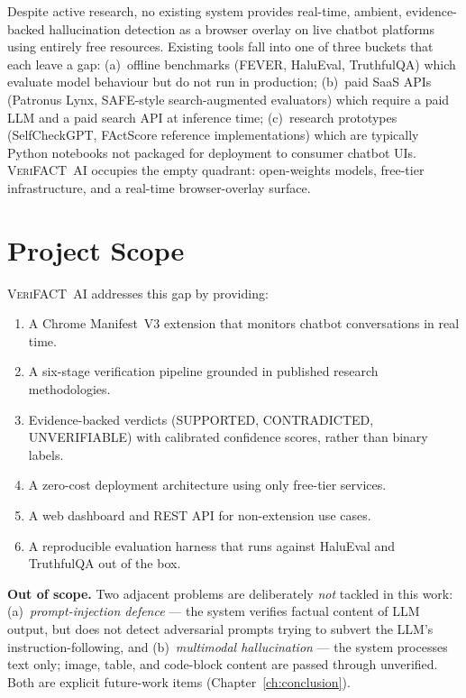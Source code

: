 \documentclass[12pt, a4paper, oneside]{report}
\newcommand{\verifact}{\textsc{VeriFACT~AI}}
\begin{document}
Despite active research, no existing system provides real-time, ambient, evidence-backed hallucination detection as a browser overlay on live chatbot platforms using entirely free resources. Existing tools fall into one of three buckets that each leave a gap: (a)~offline benchmarks (FEVER, HaluEval, TruthfulQA) which evaluate model behaviour but do not run in production; (b)~paid SaaS APIs (Patronus Lynx, SAFE-style search-augmented evaluators) which require a paid LLM and a paid search API at inference time; (c)~research prototypes (SelfCheckGPT, FActScore reference implementations) which are typically Python notebooks not packaged for deployment to consumer chatbot UIs. \verifact{} occupies the empty quadrant: open-weights models, free-tier infrastructure, and a real-time browser-overlay surface.

\section{Project Scope}

\verifact{} addresses this gap by providing:
\begin{enumerate}[nosep]
    \item A Chrome Manifest~V3 extension that monitors chatbot conversations in real time.
    \item A six-stage verification pipeline grounded in published research methodologies.
    \item Evidence-backed verdicts (SUPPORTED, CONTRADICTED, UNVERIFIABLE) with calibrated confidence scores, rather than binary labels.
    \item A zero-cost deployment architecture using only free-tier services.
    \item A web dashboard and REST API for non-extension use cases.
    \item A reproducible evaluation harness that runs against HaluEval and TruthfulQA out of the box.
\end{enumerate}

\textbf{Out of scope.} Two adjacent problems are deliberately \emph{not} tackled in this work: (a)~\emph{prompt-injection defence} --- the system verifies factual content of LLM output, but does not detect adversarial prompts trying to subvert the LLM's instruction-following, and (b)~\emph{multimodal hallucination} --- the system processes text only; image, table, and code-block content are passed through unverified. Both are explicit future-work items (Chapter~\ref{ch:conclusion}).
\end{document}
